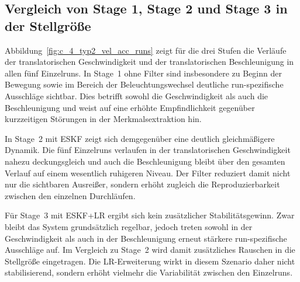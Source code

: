 \subsection{Vergleich von Stage 1, Stage 2 und Stage 3 in der Stellgröße}

Abbildung~\ref{fig:c_4_typ2_vel_acc_runs} zeigt für die drei Stufen die Verläufe der translatorischen Geschwindigkeit und der translatorischen Beschleunigung in allen fünf Einzelruns. In Stage~1 ohne Filter sind insbesondere zu Beginn der Bewegung sowie im Bereich der Beleuchtungswechsel deutliche run-spezifische Ausschläge sichtbar. Dies betrifft sowohl die Geschwindigkeit als auch die Beschleunigung und weist auf eine erhöhte Empfindlichkeit gegenüber kurzzeitigen Störungen in der Merkmalsextraktion hin.

In Stage~2 mit \ac{ESKF} zeigt sich demgegenüber eine deutlich gleichmäßigere Dynamik. Die fünf Einzelruns verlaufen in der translatorischen Geschwindigkeit nahezu deckungsgleich und auch die Beschleunigung bleibt über den gesamten Verlauf auf einem wesentlich ruhigeren Niveau. Der Filter reduziert damit nicht nur die sichtbaren Ausreißer, sondern erhöht zugleich die Reproduzierbarkeit zwischen den einzelnen Durchläufen.

Für Stage~3 mit \ac{ESKF}+\ac{LR} ergibt sich kein zusätzlicher Stabilitätsgewinn. Zwar bleibt das System grundsätzlich regelbar, jedoch treten sowohl in der Geschwindigkeit als auch in der Beschleunigung erneut stärkere run-spezifische Ausschläge auf. Im Vergleich zu Stage~2 wird damit zusätzliches Rauschen in die Stellgröße eingetragen. Die \ac{LR}-Erweiterung wirkt in diesem Szenario daher nicht stabilisierend, sondern erhöht vielmehr die Variabilität zwischen den Einzelruns.

